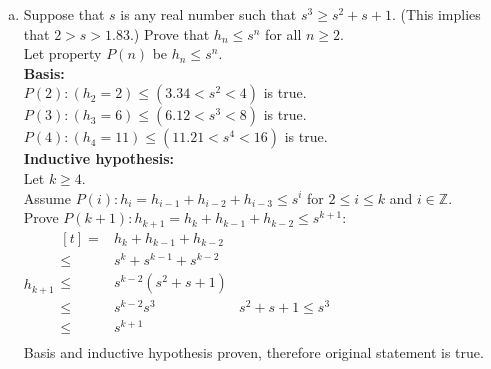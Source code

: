 \documentclass[letterpaper,fleqn,leqno]{article}
\begin{document}
{{\begin{enumerate}[(a)]
				\item
				Suppose that $s$ is any real number such that $s^3\geq s^2+s+1$. (This implies that $2>s>1.83$.) Prove that $h_n\leq s^n$ for all $n\geq2$. \\
				Let property $P(n)$ be $h_n\leq s^n$. \\
				\textbf{Basis:} \\
				$P(2): (h_2=2)\leq(3.34<s^2<4)$ is true. \\
				$P(3): (h_3=6)\leq(6.12<s^3<8)$ is true. \\
				$P(4): (h_4=11)\leq(11.21<s^4<16)$ is true. \\
				\textbf{Inductive hypothesis:} \\
				Let $k\geq4$. \\
				Assume $P(i): h_i=h_{i-1}+h_{i-2}+h_{i-3}\leq s^i$ for $2\leq i\leq k$ and $i\in\mathbb{Z}$. \\
				Prove $P(k+1): h_{k+1}=h_k+h_{k-1}+h_{k-2}\leq s^{k+1}$: \\
				$h_{k+1}\begin{aligned}[t]
					= & h_k+h_{k-1}+h_{k-2} \\
					\leq & s^k+s^{k-1}+s^{k-2} \\
					\leq & s^{k-2}\left(s^2+s+1\right) \\
					\leq & s^{k-2}s^3 & \text{$s^2+s+1\leq s^3$} \\
					\leq & s^{k+1} \\
				\end{aligned}$ \\
				Basis and inductive hypothesis proven, therefore original statement is true. \\
			\end{enumerate}
		}
	}
\end{document}
